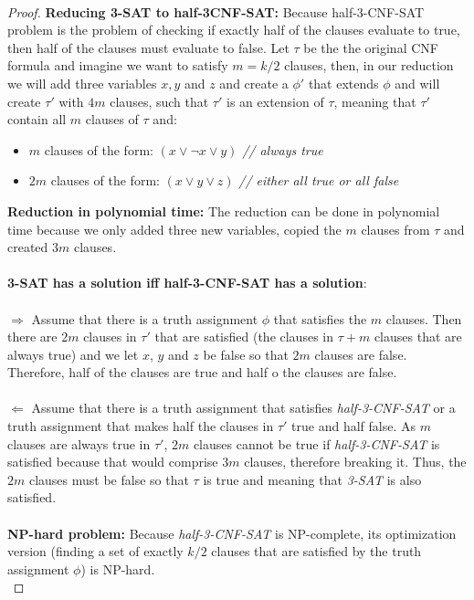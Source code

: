 \documentclass{article}
\begin{document}
\\
\begin{proof}
\textbf{Reducing 3-SAT to half-3CNF-SAT:} Because half-3-CNF-SAT problem is the problem of checking if exactly half of the clauses evaluate to true, then half of the clauses must evaluate to false. Let $\tau$ be the the original CNF formula and imagine we want to satisfy $m = k/2$ clauses, then, in our reduction we will add three variables $x, y$ and $z$ and create a $\phi'$ that extends $\phi$ and will create $\tau'$ with $4m$ clauses, such that $\tau'$ is an extension of $\tau$, meaning that $\tau'$ contain all $m$ clauses of $\tau$ and:
\begin{itemize}
\item $m$ clauses of the form: $(x \lor \lnot x \lor y)$ \textit{ // always true }
\item $2m$ clauses of the form: $(x \lor y \lor z)$ \textit{ // either all true or all false}
\end{itemize}
\textbf{Reduction in polynomial time:} The reduction can be done in polynomial time because we only added three new variables, copied the $m$ clauses from $\tau$ and created $3m$ clauses.
\\
\\
\textbf{3-SAT has a solution iff half-3-CNF-SAT has a solution}:
\\
\\
$\Longrightarrow $ Assume that there is a truth assignment $\phi$ that satisfies the $m$ clauses. Then there are $2m$ clauses in $\tau'$ that are satisfied (the clauses in $\tau + m$ clauses that are always true) and we let $x$, $y$ and $z$ be false so that $2m$ clauses are false. Therefore, half of the clauses are true and half o the clauses are false.
\\
\\
$\Longleftarrow $ Assume that there is a truth assignment that satisfies \textit{half-3-CNF-SAT} or a truth assignment that makes half the clauses in $\tau'$ true and half false. As $m$ clauses are always true in $\tau'$, $2m$ clauses cannot be true if \textit{half-3-CNF-SAT} is satisfied because that would comprise $3m$ clauses, therefore breaking it. Thus, the $2m$ clauses must be false so that $\tau$ is true and meaning that \textit{3-SAT} is also satisfied. 
\\
\\
\textbf{NP-hard problem:} Because \textit{half-3-CNF-SAT} is {NP-complete}, its optimization version (finding a set of exactly $k/2$ clauses that are satisfied by the truth assignment $\phi$) is NP-hard.
\\
\end{proof}
\end{document}
